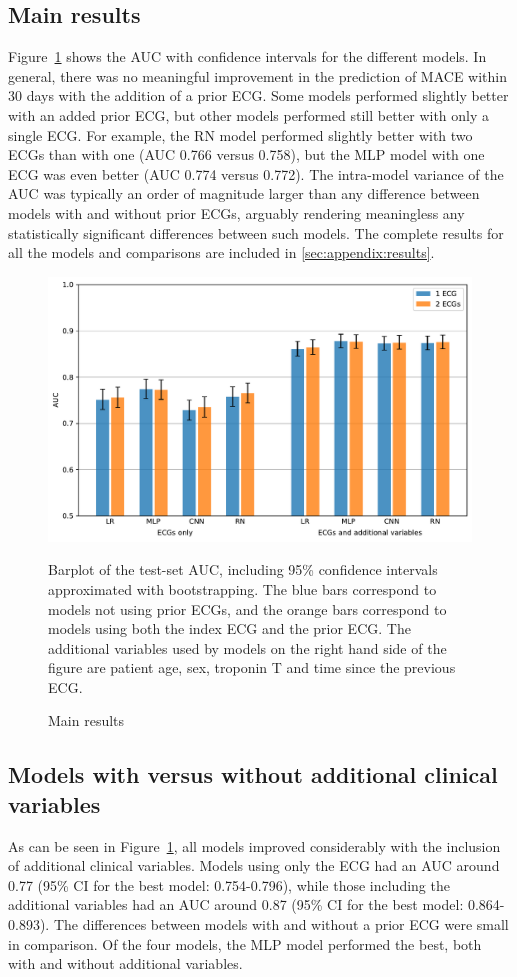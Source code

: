 \documentclass[preprint]{elsarticle}
\begin{document}
\subsection{Main results}
Figure~\ref{fig:mainresults} shows the AUC with confidence intervals for the different models. In general, there was no meaningful improvement in the prediction of MACE within 30 days with the addition of a prior ECG. Some models performed slightly better with an added prior ECG, but other models performed still better with only a single ECG. For example, the RN model performed slightly better with two ECGs than with one (AUC 0.766 versus 0.758), but the MLP model with one ECG was even better (AUC 0.774 versus 0.772). The intra-model variance of the AUC was typically an order of magnitude larger than any difference between models with and without prior ECGs, arguably rendering meaningless any statistically significant differences between such models. The complete results for all the models and comparisons are included in \ref{sec:appendix:results}. 

\begin{figure}[h!]
\includegraphics[width=\linewidth]{main_results.pdf}
\caption{Main results}
\medskip
\small
Barplot of the test-set AUC, including 95\% confidence intervals approximated with bootstrapping. The blue bars correspond to models not using prior ECGs, and the orange bars correspond to models using both the index ECG and the prior ECG. The additional variables used by models on the right hand side of the figure are patient age, sex, troponin T and time since the previous ECG.
\label{fig:mainresults}
\end{figure}

\subsection{Models with versus without additional clinical variables}
As can be seen in Figure~\ref{fig:mainresults}, all models improved considerably with the inclusion of additional clinical variables. Models using only the ECG had an AUC around 0.77 (95\% CI for the best model: 0.754-0.796), while those including the additional variables had an AUC around 0.87 (95\% CI for the best model: 0.864-0.893). The differences between models with and without a prior ECG were small in comparison. Of the four models, the MLP model performed the best, both with and without additional variables.
\end{document}
